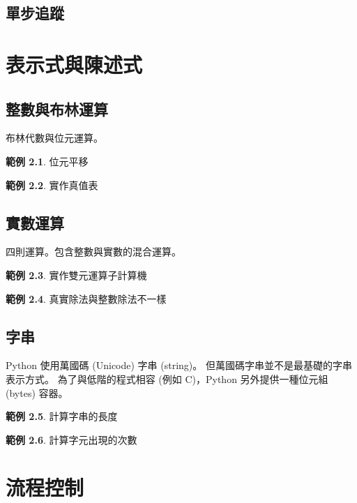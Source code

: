 \documentclass[a4paper,12pt]{book}
\theoremstyle{definition}
\newtheorem{example}{範例}[chapter]
\begin{document}
\section{單步追蹤}

\chapter{表示式與陳述式}
%
\label{c:arithmic}

\section{整數與布林運算}

布林代數與位元運算。

\begin{example}
位元平移
\end{example}

\begin{example}
實作真值表
\end{example}

\section{實數運算}

四則運算。包含整數與實數的混合運算。

\begin{example}
實作雙元運算子計算機
\end{example}

\begin{example}
真實除法與整數除法不一樣
\end{example}

\section{字串}

Python 使用萬國碼 (Unicode) 字串 (string)。
但萬國碼字串並不是最基礎的字串表示方式。
為了與低階的程式相容 (例如 C)，Python 另外提供一種位元組 (bytes) 容器。

\begin{example}
計算字串的長度
\end{example}

\begin{example}
計算字元出現的次數
\end{example}

\chapter{流程控制}
%
\label{c:flow}
\end{document}
